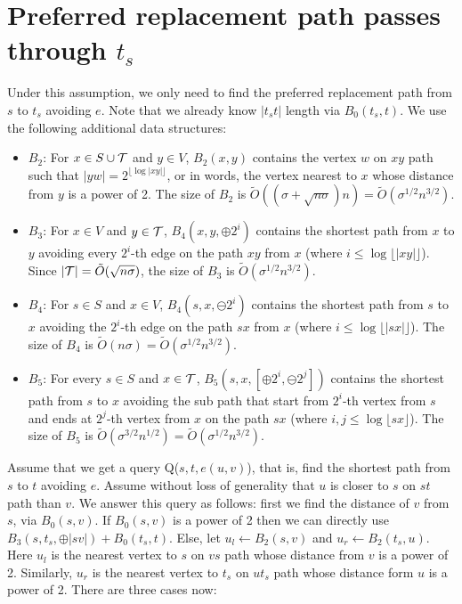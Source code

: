 \iflong
\else
\vspace{-2mm}
\fi
\section{Preferred replacement path passes through $t_s$}
\label{sec:passes}
\iflong
Under this assumption, we only need to find the preferred replacement path from $s$ to $t_s$ avoiding $e$. Note that we already know $|t_st|$ length via $B_0(t_{s},t)$. We use the following additional data structures:



\begin{itemize}[leftmargin=*,noitemsep,nolistsep]
\item $B_2$: For $x \in S \cup \mathcal{T}$ and $y \in V$, $B_2(x,y)$ contains the vertex $w$ on $xy$ path such that $|yw| = 2^{\lfloor \log |xy| \rfloor}$, or in words, the vertex nearest to $x$ whose distance from $y$ is a power of 2. The size of $B_2$ is $\tilde O((\sigma+\sqrt{n\sigma})n) = \tilde O(\sigma^{1/2}n^{3/2})$.

\item $B_3$: For $x \in V$ and $y \in \mathcal{T}$, $B_4(x,y, \oplus2^i)$
contains the shortest path from $x$ to $y$ avoiding every
$2^i$-th
edge on the path $xy$ from $x$ (where $i \le \log \lfloor
|xy| \rfloor$). Since $|\mathcal{T}| = \tilde O(\sqrt{n \sigma})$, the size
of $B_3$ is $\tilde O( \sigma^{1/2} n^{3/2} )$.

\item $B_4$: For $s \in S$ and $x \in V$, $B_4(s,x, \ominus2^i)$ contains  the shortest path from $s$ to $x$ avoiding the $2^i$-th
edge on the path $sx$ from $x$ (where $i \le \log \lfloor |sx| \rfloor$). The size of $B_4$ is $ \tilde O( n \sigma) = \tilde O( \sigma^{1/2} n^{3/2} )$.



\item $B_5$: For every $s \in S$ and $x \in \mathcal{T}$, $B_5(s,x, [\oplus 2^i, \ominus 2^j])$ contains the shortest path from $s$ to $x$ avoiding the sub path
that start from $2^i$-th vertex from $s$ and ends at $2^j$-th
vertex from $x$ on the path $sx$ (where  $i,j \le \log \lfloor sx \rfloor$). The size of $B_5$ is $\tilde O(\sigma^{3/2} n^{1/2}) = \tilde O( \sigma^{1/2} n^{3/2} )$.


\end{itemize}

\noindent   Assume that we get a query
{\sc Q}($s,t,e(u,v)$), that is, find the shortest path from
$s$ to $t$ avoiding $e$. Assume without loss of generality that $u$ is closer to $s$ on $st$ path than $v$. We answer this query as follows:
first we find the distance of $v$ from $s$, via $B_0(s,v)$. If $B_0(s,v)$ is a power of 2 then
we can directly use $B_3(s,t_s, \oplus |sv|) + B_0(t_s,t)$. Else, let $u_l \leftarrow  B_2(s,v)$ and
$u_r \leftarrow B_2(t_s,u)$. Here $u_l$ is the nearest vertex to $s$ on $vs$ path whose
 distance from $v$ is a power of 2. Similarly, $u_r$ is the nearest vertex to $t_s$ on $ut_s$ path whose distance form $u$ is a power of 2.    There are three cases now:

